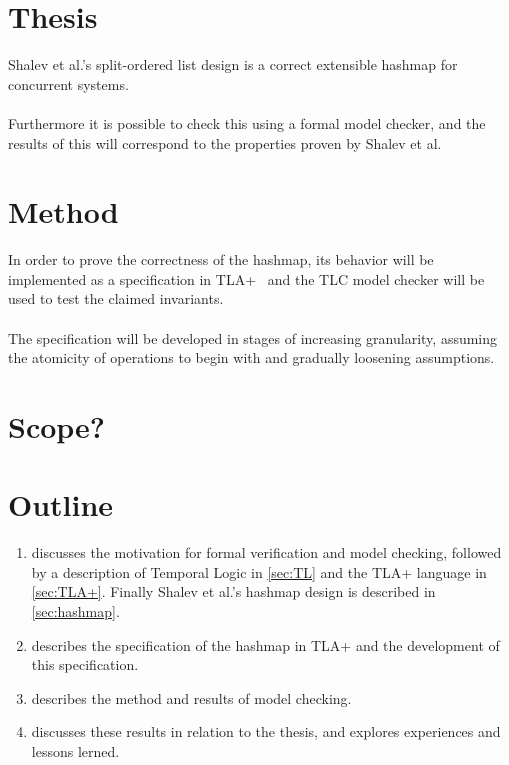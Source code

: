 \documentclass{uit-thesis}
\begin{document}
\section{Thesis}
Shalev et al.'s split-ordered list design is a correct extensible hashmap for concurrent systems.
\\\\
Furthermore it is possible to check this using a formal model checker, and the results of this will correspond to the properties proven by Shalev et al.

\section{Method}
In order to prove the correctness of the hashmap, its behavior will be implemented as a specification in TLA+~\cite{Lamport_specifying_2002} and the TLC model checker will be used to test the claimed invariants.
\\\\
The specification will be developed in stages of increasing granularity, assuming the atomicity of operations to begin with and gradually loosening assumptions.

\section{Scope?}

\section{Outline}
\begin{enumerate}[label={}]
    \item \textbf{} discusses the motivation for formal verification and model checking, followed by a description of Temporal Logic in \autoref{sec:TL} and the TLA+ language in \autoref{sec:TLA+}. Finally Shalev et al.'s hashmap design is described in \autoref{sec:hashmap}.
    \item \textbf{} describes the specification of the hashmap in TLA+ and the development of this specification.
    \item \textbf{} describes the method and results of model checking.
    \item \textbf{} discusses these results in relation to the thesis, and explores experiences and lessons lerned.
\end{enumerate}
\end{document}

